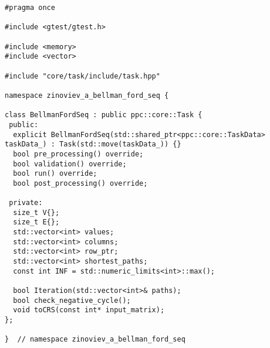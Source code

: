 \documentclass[12pt]{article}
\begin{document}
\begin{lstlisting}[caption={ops\_seq\_.hpp}]
#pragma once

#include <gtest/gtest.h>

#include <memory>
#include <vector>

#include "core/task/include/task.hpp"

namespace zinoviev_a_bellman_ford_seq {

class BellmanFordSeq : public ppc::core::Task {
 public:
  explicit BellmanFordSeq(std::shared_ptr<ppc::core::TaskData> taskData_) : Task(std::move(taskData_)) {}
  bool pre_processing() override;
  bool validation() override;
  bool run() override;
  bool post_processing() override;

 private:
  size_t V{};
  size_t E{};
  std::vector<int> values;
  std::vector<int> columns;
  std::vector<int> row_ptr;
  std::vector<int> shortest_paths;
  const int INF = std::numeric_limits<int>::max();

  bool Iteration(std::vector<int>& paths);
  bool check_negative_cycle();
  void toCRS(const int* input_matrix);
};

}  // namespace zinoviev_a_bellman_ford_seq
\end{lstlisting}

\newpage
\end{document}
